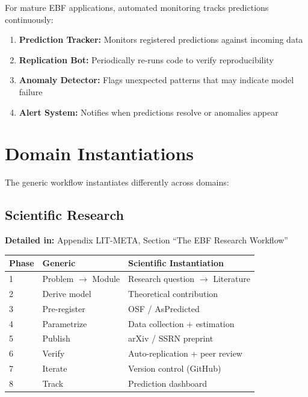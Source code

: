 For mature EBF applications, automated monitoring tracks predictions continuously:

\begin{enumerate}[nosep]
    \item \textbf{Prediction Tracker:} Monitors registered predictions against incoming data
    \item \textbf{Replication Bot:} Periodically re-runs code to verify reproducibility
    \item \textbf{Anomaly Detector:} Flags unexpected patterns that may indicate model failure
    \item \textbf{Alert System:} Notifies when predictions resolve or anomalies appear
\end{enumerate}



\section{Domain Instantiations}
\label{sec:apply-domains}

The generic workflow instantiates differently across domains:

\subsection{Scientific Research}

\textbf{Detailed in:} Appendix LIT-META, Section ``The EBF Research Workflow''

\begin{center}
\small
\begin{tabular}{@{}lll@{}}
\toprule
\textbf{Phase} & \textbf{Generic} & \textbf{Scientific Instantiation} \\
\midrule
1 & Problem $\to$ Module & Research question $\to$ Literature \\
2 & Derive model & Theoretical contribution \\
3 & Pre-register & OSF / AsPredicted \\
4 & Parametrize & Data collection + estimation \\
5 & Publish & arXiv / SSRN preprint \\
6 & Verify & Auto-replication + peer review \\
7 & Iterate & Version control (GitHub) \\
8 & Track & Prediction dashboard \\
\bottomrule
\end{tabular}
\end{center}

